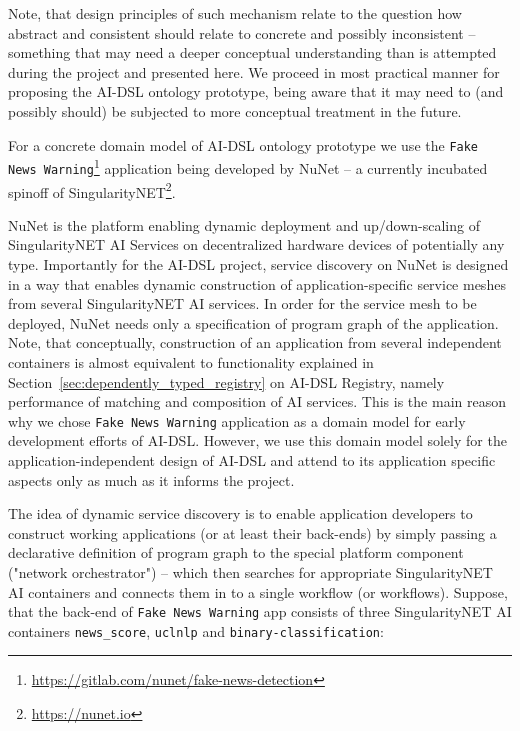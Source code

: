 \documentclass[]{report}
\begin{document}
Note, that design principles of such mechanism relate to the question how
abstract and consistent should relate to concrete and possibly inconsistent --
something that may need a deeper conceptual understanding than is attempted
during the project and presented here. We proceed in most practical manner for
proposing the AI-DSL ontology prototype, being aware that it may need to (and
possibly should) be subjected to more conceptual treatment in the future.

For a concrete domain model of AI-DSL ontology prototype we use the
\texttt{Fake News
Warning}\footnote{\href{https://gitlab.com/nunet/fake-news-detection}{https://gitlab.com/nunet/fake-news-detection}}
application being developed by NuNet -- a currently incubated spinoff of
SingularityNET\footnote{\href{https://nunet.io}{https://nunet.io}}.

NuNet is the platform enabling dynamic deployment and up/down-scaling of
SingularityNET AI Services on decentralized hardware devices of potentially any
type. Importantly for the AI-DSL project, service discovery on NuNet is designed
in a way that enables dynamic construction of application-specific service
meshes from several SingularityNET AI services\cite{nunet_nunet_2021}. In order
for the service mesh to be deployed, NuNet needs only a specification of program
graph of the application. Note, that conceptually, construction of an
application from several independent containers is almost equivalent to
functionality explained in Section~\ref{sec:dependently_typed_registry} on AI-DSL Registry,
namely performance of matching and composition of AI services. This is the main
reason why we chose \texttt{Fake News Warning} application as a domain model
for early development efforts of AI-DSL. However, we use this domain model
solely for the application-independent design of AI-DSL and attend to
its application specific aspects only as much as it informs the project.

The idea of dynamic service discovery is to enable application developers to
construct working applications (or at least their back-ends) by simply passing a
declarative definition of program graph to the special platform component
("network orchestrator") -- which then searches for appropriate SingularityNET
AI containers and connects them in to a single workflow (or workflows).
Suppose, that the back-end of \texttt{Fake News Warning} app consists of three
SingularityNET AI containers \texttt{news\_score}, \texttt{uclnlp} and
\texttt{binary-classification}:
\end{document}
